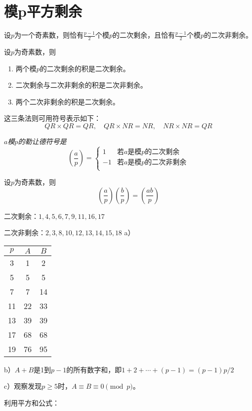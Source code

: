 \chapter{模p平方剩余}
\begin{theorem}
设$p$为一个奇素数，则恰有$\frac{p-1}{2}$个模$p$的二次剩余，且恰有$\frac{p-1}{2}$个模$p$的二次非剩余。
\end{theorem}
\begin{theorem}[二次剩余乘法法则---版本1]
设$p$为奇素数，则
\begin{enumerate}
\item 两个模$p$的二次剩余的积是二次剩余。
\item 二次剩余与二次非剩余的积是二次非剩余。
\item 两个二次非剩余的积是二次剩余。
\end{enumerate}
这三条法则可用符号表示如下：
\[QR\times QR=QR,\quad QR\times NR=NR,\quad NR\times NR=QR\]
\end{theorem}
{\itshape $a$模$p$的勒让德符号是
\[\left(\frac{a}{p}\right)=
\begin{cases}
1 & \text{若$a$是模$p$的二次剩余} \\
-1 & \text{若$a$是模$p$的二次非剩余} \\
\end{cases}
\]}
\begin{theorem}[二次剩余乘法法则---版本2]
设$p$为奇素数，则
\[\left(\frac{a}{p}\right)\left(\frac{b}{p}\right)=\left(\frac{ab}{p}\right)\]
\end{theorem}
%
\exercise 二次剩余：$1, 4, 5, 6, 7, 9, 11, 16, 17$\par
二次非剩余：$2,3,8,10,12,13,14,15,18$
%
\exercise a）
\begin{center}
\begin{tabular}{c|c|c}
$p$ & $A$ & $B$ \\
\hline 
3 & 1 & 2 \\
5 & 5 & 5 \\
7 & 7 & 14 \\
11 & 22 & 33 \\
13 & 39 & 39 \\
17 & 68 & 68 \\
19 & 76 & 95 \\
\end{tabular}
\end{center}
b）$A+B$是1到$p-1$的所有数字和，即$1+2+\cdots+(p-1)=(p-1)p/2$\par
c）观察发现$p\ge5$时，$A\equiv B\equiv0\pmod p$。\par
\proof 利用平方和公式：
